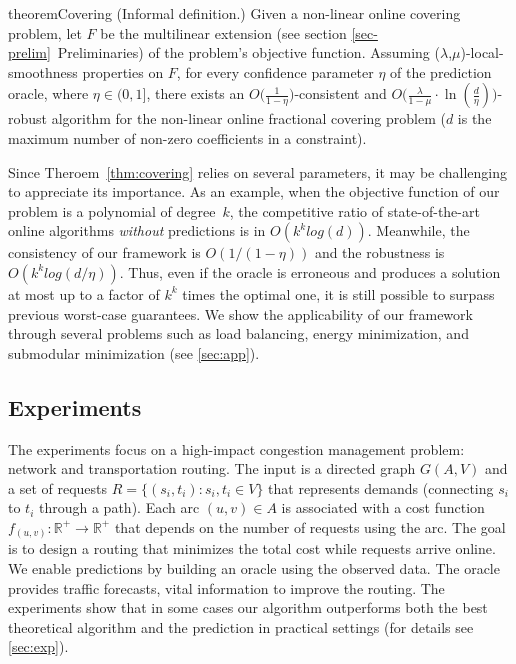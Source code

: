 \begin{restatable}{theorem}{Covering}
    \label{thm:covering}
    (Informal definition.) Given a non-linear online covering problem, let $F$ be the multilinear extension (see section \ref{sec-prelim}~Preliminaries) of the problem's objective function. Assuming ($\lambda$,$\mu$)-local-smoothness properties on $F$, for every confidence parameter $\eta$ of the prediction oracle, where $\eta \in (0,1]$, there exists an $O\bigl( \frac{1}{1 - \eta} \bigr)$-consistent and
    $O\bigl( \frac{\lambda}{1 - \mu}  \cdot \ln \left(\frac{d}{\eta}\right) \bigr)$-robust algorithm for the non-linear online fractional covering problem ($d$ is the maximum number of non-zero coefficients in a constraint).
\end{restatable}

Since Theroem~\ref{thm:covering} relies on several parameters, it may be challenging to appreciate its importance. As an example, when the objective function of our problem is a polynomial of degree~$k$, the competitive ratio of state-of-the-art online algorithms \emph{without} predictions is in $O(k^k log(d))$. Meanwhile, the consistency of our framework is $O(1 / (1-\eta))$ and the robustness is $O(k^k log(d/\eta))$. Thus, even if the oracle is erroneous and produces a solution at most up to a factor of $k^k$ times the optimal one, it is still possible to surpass previous worst-case guarantees. We show the applicability of our framework through several problems such as load balancing,
energy minimization, and submodular minimization (see \cref{sec:app}).

\subsection{Experiments}
The experiments focus on a high-impact congestion management problem: network and transportation routing. The input is a directed graph $G(A,V)$ and a set of requests $R = \{(s_{i}, t_{i}) : s_{i}, t_{i} \in V\}$ that represents demands (connecting $s_{i}$ to $t_{i}$ through a path). Each arc $(u, v) \in A$ is associated with a cost function $f_{(u,v)}: \mathbb{R}^{+} \rightarrow \mathbb{R}^{+}$ that depends on the number of requests using the arc. The goal is to design a routing that minimizes the total cost while requests arrive online. We enable predictions by building an oracle using the observed data. The oracle provides traffic forecasts, vital information to improve the routing. The experiments show that in some cases our algorithm outperforms both the best theoretical algorithm and the prediction in practical settings (for details see \cref{sec:exp}).


